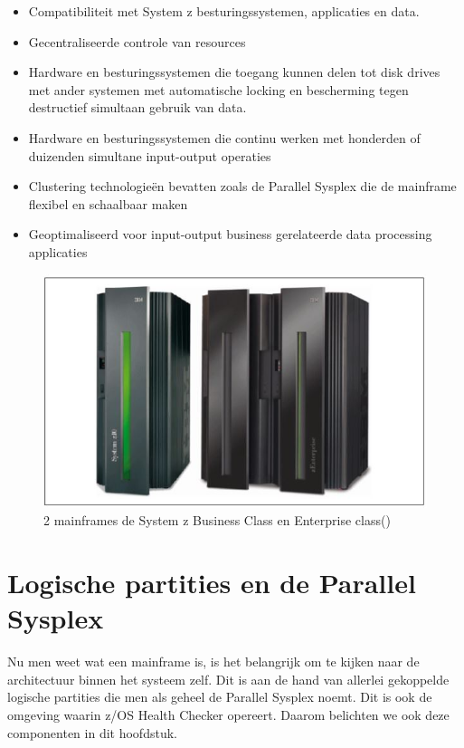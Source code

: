 \begin{itemize}
	\item Compatibiliteit met System z besturingssystemen, applicaties en data.
	\item Gecentraliseerde controle van resources
	\item Hardware en besturingssystemen die toegang kunnen delen tot disk drives met ander systemen met automatische locking en bescherming tegen destructief simultaan gebruik van data.
	\item Hardware en besturingssystemen die continu werken met honderden of duizenden simultane input-output operaties
	\item Clustering technologieën bevatten zoals de Parallel Sysplex die de mainframe flexibel en schaalbaar maken
	\item Geoptimaliseerd voor input-output business gerelateerde data processing applicaties
\end{itemize}

\begin{figure}[h]
	\centering
	\includegraphics{img/mainframe}
	\caption[Mainframe]{2 mainframes de System z Business Class en Enterprise class(\cite{Ebbers2011})}
	\label{fig:mainframe}
\end{figure}



\section{Logische partities en de Parallel Sysplex}
\label{sec:Logische partities en de Parallel Sysplex}

Nu men weet wat een mainframe is, is het belangrijk om te kijken naar de architectuur binnen het systeem zelf. Dit is aan de hand van allerlei gekoppelde logische partities die men als geheel de Parallel Sysplex noemt. Dit is ook de omgeving waarin z/OS Health Checker opereert. Daarom belichten we ook deze componenten in dit hoofdstuk.

